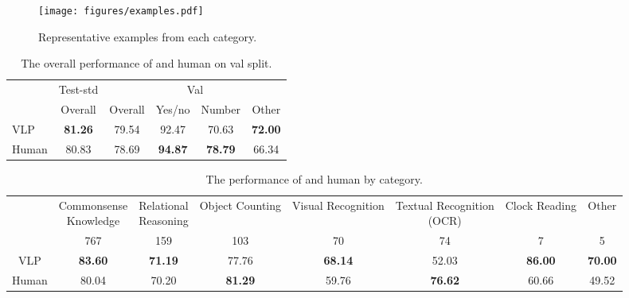 \begin{figure}[t] \centering
    \texttt{[image: figures/examples.pdf]}
    \caption{Representative examples from each category.}
    \label{fig:examples}
\end{figure}










\begin{table}[t]
\caption{The overall performance of \modelname and human on val split.}\label{tab:human_overall}
\setlength{\tabcolsep}{0.6mm}
\centering
\begin{tabular}{l|c|cccc}
\toprule
\multirow{2}{*}{} & Test-std & \multicolumn{4}{c}{Val}           \\
\cmidrule{2-6}
                  & Overall        & Overall & Yes/no & Number & Other \\
\midrule
VLP     &    \bf 81.26    &  79.54       & 92.47      & 70.63      & \bf 72.00     \\
Human                                 & 80.83          & 78.69   & \bf 94.87  & \bf 78.79  &  66.34\\
\bottomrule
\end{tabular}
\end{table}

\begin{table}[t]
\centering
\setlength{\tabcolsep}{0.6mm}
\caption{The performance of \modelname and human by category.}\label{tab:human_category}
\begin{tabular}{c|ccccccc}
\toprule
      & \tabincell{c}{Commonsense \\Knowledge} & \tabincell{c}{Relational \\Reasoning} & Object Counting & Visual Recognition & \tabincell{c}{Textual Recognition \\ (OCR)} & Clock Reading & Other \\
      \cmidrule{2-8}
& 767 & 159  & 103 & 70  & 74 & 7  & 5  \\
\midrule
VLP   & \bf 83.60   & \bf 71.19 & 77.76  & \bf 68.14     & 52.03 & \bf 86.00 & \bf  70.00 \\
Human & 80.04                  & 70.20     & \bf  81.29           & 59.76              & \bf 76.62                     & 60.66 & 49.52 \\
\bottomrule
\end{tabular}
\end{table}

